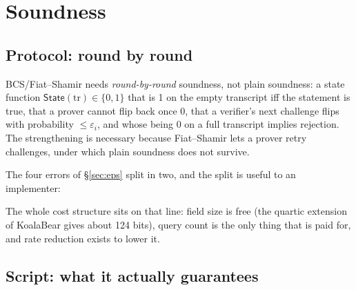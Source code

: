\documentclass[11pt,a4paper]{article}
\begin{document}
\section{Soundness}

\subsection*{Protocol: round by round}

BCS/Fiat--Shamir needs \emph{round-by-round} soundness, not plain soundness: a state function
$\mathsf{State}(\mathrm{tr})\in\{0,1\}$ that is 1 on the empty transcript iff the statement is true,
that a prover cannot flip back once 0, that a verifier's next challenge flips with probability
$\le\varepsilon_{i}$, and whose being 0 on a full transcript implies rejection. The strengthening is
necessary because Fiat--Shamir lets a prover retry challenges, under which plain soundness does not
survive.

The four errors of \S\ref{sec:eps} split in two, and the split is useful to an implementer:

\medskip
\noindent{}
\medskip

The whole cost structure sits on that line: field size is free (the quartic extension of KoalaBear
gives about 124 bits), query count is the only thing that is paid for, and rate reduction exists to
lower it.

\subsection*{Script: what it actually guarantees}
\end{document}
